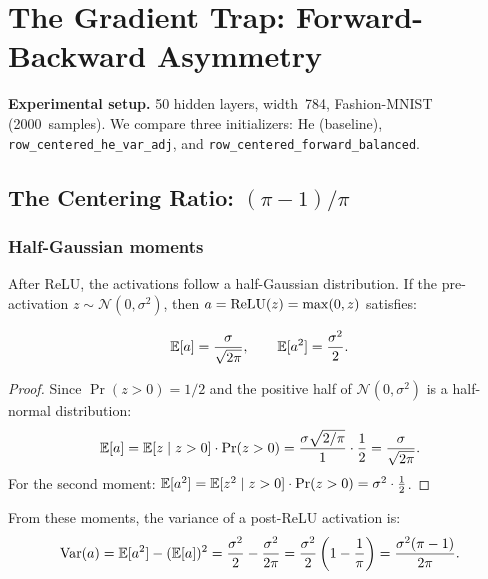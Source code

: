 \chapter{The Gradient Trap: Forward-Backward Asymmetry}
\label{ch:gradient_trap}

\noindent
\textbf{Experimental setup.}
50 hidden layers, width~784, Fashion-MNIST (2000~samples).
We compare three initializers: He (baseline),
\texttt{row\_centered\_he\_var\_adj}, and
\texttt{row\_centered\_forward\_balanced}.

\section{The Centering Ratio: $(\pi-1)/\pi$}
\label{sec:centering_ratio}

\subsection{Half-Gaussian moments}

After ReLU, the activations follow a half-Gaussian distribution.
If the pre-activation $z \sim \mathcal{N}(0, \sigma^2)$, then
$a = \operatorname{ReLU}(z) = \max(0,z)$ satisfies:

\begin{lemma}
\label{lem:half_gaussian}
\begin{equation}\label{eq:half_gauss_moments}
  \mathbb{E}[a] = \frac{\sigma}{\sqrt{2\pi}},
  \qquad
  \mathbb{E}[a^2] = \frac{\sigma^2}{2}.
\end{equation}
\end{lemma}

\begin{proof}
Since $\Pr(z > 0) = 1/2$ and the positive half of $\mathcal{N}(0,\sigma^2)$
is a half-normal distribution:
\[
  \mathbb{E}[a] = \mathbb{E}[z \mid z > 0] \cdot \Pr(z > 0)
  = \frac{\sigma\sqrt{2/\pi}}{1} \cdot \frac{1}{2}
  = \frac{\sigma}{\sqrt{2\pi}}.
\]
For the second moment:
$\mathbb{E}[a^2] = \mathbb{E}[z^2 \mid z > 0]\cdot\Pr(z > 0) = \sigma^2 \cdot \frac{1}{2}$.
\end{proof}

From these moments, the variance of a post-ReLU activation is:
\begin{equation}\label{eq:var_a}
  \operatorname{Var}(a) = \mathbb{E}[a^2] - (\mathbb{E}[a])^2
  = \frac{\sigma^2}{2} - \frac{\sigma^2}{2\pi}
  = \frac{\sigma^2}{2}\left(1 - \frac{1}{\pi}\right)
  = \frac{\sigma^2(\pi - 1)}{2\pi}.
\end{equation}

